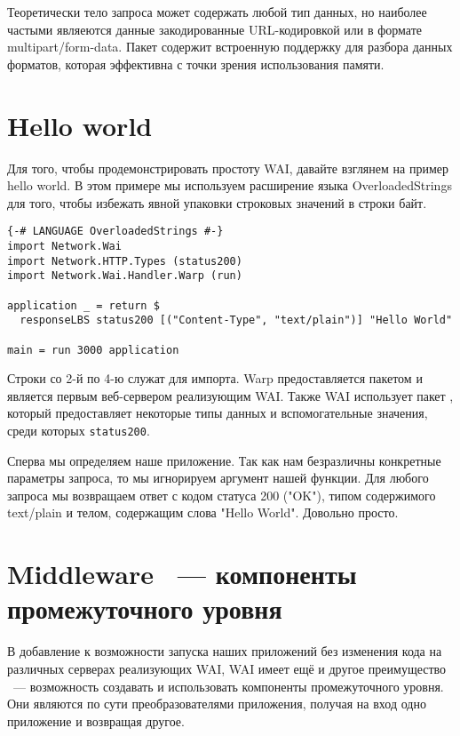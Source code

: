Теоретически тело запроса может содержать любой тип данных, но наиболее частыми являеются данные
закодированные URL-кодировкой или в формате multipart/form-data. Пакет
 содержит встроенную
поддержку для разбора данных форматов, которая эффективна с точки зрения использования памяти.

\section{Hello world}

Для того, чтобы продемонстрировать простоту WAI, давайте взглянем на пример hello world.
В этом примере мы используем расширение языка OverloadedStrings для того, чтобы избежать
явной упаковки строковых значений в строки байт.

\begin{lstlisting}
{-# LANGUAGE OverloadedStrings #-}
import Network.Wai
import Network.HTTP.Types (status200)
import Network.Wai.Handler.Warp (run)

application _ = return $
  responseLBS status200 [("Content-Type", "text/plain")] "Hello World"

main = run 3000 application
\end{lstlisting}%

Строки со 2-й по 4-ю служат для импорта. Warp предоставляется пакетом
 и является первым веб-сервером реализующим WAI. Также WAI использует пакет
, который
предоставляет некоторые типы данных и вспомогательные значения,
среди которых \lstinline!status200!.

Сперва мы определяем наше приложение. Так как нам безразличны конкретные параметры
запроса, то мы игнорируем аргумент нашей функции. Для любого запроса мы возвращаем
ответ с кодом статуса 200 ("OK"), типом содержимого text/plain и телом, содержащим
слова "Hello World". Довольно просто.

\section {Middleware ~--- компоненты промежуточного уровня}

В добавление к возможности запуска наших приложений без изменения
кода на различных серверах реализующих WAI, WAI имеет ещё и другое преимущество ~--- возможность создавать и использовать компоненты промежуточного уровня. Они являются по сути
преобразователями приложения, получая на вход одно приложение и возвращая другое.

